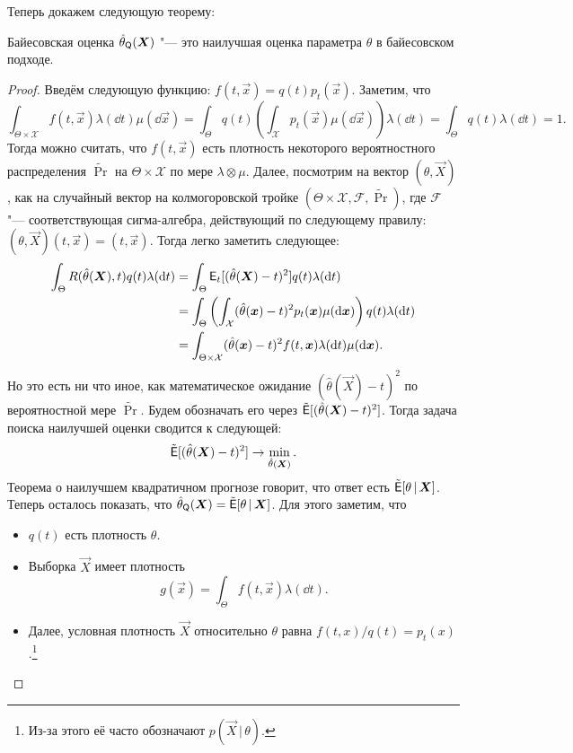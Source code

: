 Теперь докажем следующую теорему:
\begin{theorem}
    Байесовская оценка $\hat{\theta}_{\mathsf{Q}}(\bm{X})$ "--- это наилучшая оценка параметра $\theta$ в байесовском подходе.
\end{theorem}
\begin{proof}
    Введём следующую функцию: $f(t, \vec{x}) = q(t)p_{t}(\vec{x})$. Заметим, что
    \[
        \int_{\Theta \times \mathcal{X}} f(t, \vec{x})\lambda(\dd t)\mu(\dd \vec{x}) = \int_{\Theta} q(t) \left(\int_{\mathcal{X}} p_{t}(\vec{x})\mu(\dd \vec{x})\right) \lambda(\dd t) = \int_{\Theta} q(t) \lambda(\dd t) = 1.
    \]
    Тогда можно считать, что $f(t, \vec{x})$ есть плотность некоторого вероятностного распределения $\tilde{\Pr}$ на $\Theta \times \mathcal{X}$ по мере $\lambda \otimes \mu$. Далее, посмотрим на вектор $(\theta, \vec{X})$, как на случайный вектор на колмогоровской тройке $(\Theta \times \mathcal{X}, \mathcal{F}, \tilde{\Pr})$, где $\mathcal{F}$ "--- соответствующая сигма-алгебра, действующий по следующему правилу: $(\theta, \vec{X})(t, \vec{x}) = (t, \vec{x})$. Тогда легко заметить следующее:
    \begin{align*}
        \int_{\Theta} R(\hat{\theta}(\bm{X}), t) q(t)\lambda(\dd t)
        &= \int_{\Theta} \operatorname{\mathsf{E}}_{t}[(\hat{\theta}(\bm{X}) - t)^{2}] q(t)\lambda(\dd t) \\
        &= \int_{\Theta} \left(\int_{\mathcal{X}} (\hat{\theta}(\bm{x}) - t)^{2} p_{t}(\bm{x})\mu(\dd \bm{x})\right) q(t)\lambda(\dd t) \\
        &= \int_{\Theta \times \mathcal{X}} (\hat{\theta}(\bm{x}) - t)^{2} f(t, \bm{x}) \lambda(\dd t)\mu(\dd \bm{x}).
    \end{align*}
    Но это есть ни что иное, как математическое ожидание $(\hat{\theta}(\vec{X}) - t)^{2}$ по вероятностной мере $\tilde{\Pr}$. Будем обозначать его через $\tilde{\operatorname{\mathsf{E}}}[(\hat{\theta}(\bm{X}) - t)^{2}]$. Тогда задача поиска наилучшей оценки сводится к следующей:
    \[
        \tilde{\operatorname{\mathsf{E}}}[(\hat{\theta}(\bm{X}) - t)^{2}] \to \min_{\hat{\theta}(\bm{X})}.
    \]
    Теорема о наилучшем квадратичном прогнозе говорит, что ответ есть $\tilde{\operatorname{\mathsf{E}}}[\theta\,|\,\bm{X}]$. Теперь осталось показать, что $\hat{\theta}_{\mathsf{Q}}(\bm{X}) = \tilde{\operatorname{\mathsf{E}}}[\theta\,|\,\bm{X}]$. Для этого заметим, что
    \begin{itemize}
        \item $q(t)$ есть плотность $\theta$.
        \item Выборка $\vec{X}$ имеет плотность
        \[
            g(\vec{x}) = \int_{\Theta} f(t, \vec{x}) \lambda(\dd t).
        \]
        \item Далее, условная плотность $\vec{X}$ относительно $\theta$ равна $f(t, x)/q(t) = p_{t}(x)$.\footnote{Из-за этого её часто обозначают $p(\vec{X}\,|\,\theta)$.}
    \end{itemize} 
    

\end{proof}
